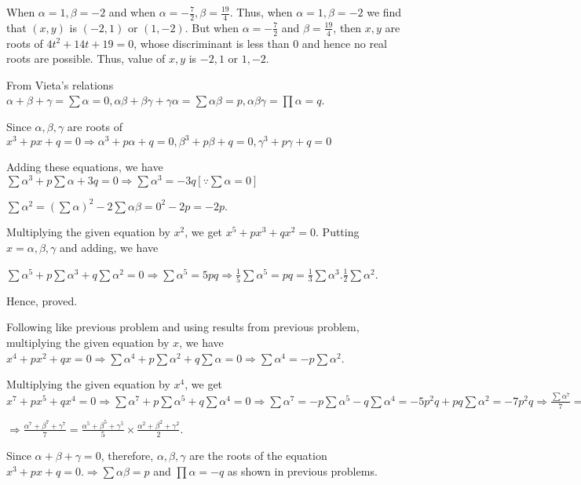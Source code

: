   When $\alpha = 1, \beta = -2$ and when $\alpha = -\frac{7}{2}, \beta = \frac{19}{4}$. Thus, when $\alpha
  =1, \beta = -2$ we find that $(x, y)$ is $(-2, 1)$ or $(1, -2)$. But when $\alpha = -\frac{7}{2}$ and
  $\beta = \frac{19}{4}$, then $x, y$ are roots of $4t^2 + 14t + 19 = 0$, whose discriminant is less than
  $0$ and hence no real roots are possible. Thus, value of $x, y$ is $-2, 1$ or $1, -2$.
\item From Vieta's relations $\alpha + \beta + \gamma = \sum \alpha = 0, \alpha\beta + \beta\gamma +
  \gamma\alpha = \sum \alpha\beta = p, \alpha\beta\gamma = \prod\alpha = q$.

  Since $\alpha, \beta, \gamma$ are roots of $x^3 + px + q = 0 \Rightarrow \alpha^3 + p\alpha + q = 0,
  \beta^3 + p\beta + q = 0, \gamma^3 + p\gamma + q = 0$

  Adding these equations, we have $\sum\alpha^3 + p\sum\alpha + 3q = 0 \Rightarrow \sum\alpha^3 =
  -3q[\because \sum\alpha = 0]$

  $\sum\alpha^2 = (\sum\alpha)^2 - 2\sum\alpha\beta = 0^2 - 2p = -2p$.

  Multiplying the given equation by $x^2$, we get $x^5 + px^3 + qx^2 = 0$. Putting $x = \alpha, \beta,
  \gamma$ and adding, we have

  $\sum\alpha^5 + p\sum\alpha^3 + q\sum\alpha^2 = 0 \Rightarrow \sum\alpha^5 = 5pq\Rightarrow
  \frac{1}{5}\sum\alpha^5 = pq = \frac{1}{3}\sum\alpha^3 .
  \frac{1}{2}\sum\alpha^2$.

  Hence, proved.
\item Following like previous problem and using results from previous problem, multiplying the given
  equation by $x$, we have $x^4 + px^2 + qx = 0 \Rightarrow \sum\alpha^4 + p\sum\alpha^2 + q\sum\alpha =
  0\Rightarrow \sum\alpha^4 = -p\sum\alpha^2$.

  Multiplying the given equation by $x^4$, we get $x^7 + px^5 + qx^4 = 0 \Rightarrow \sum\alpha^7 +
  p\sum\alpha^5 + q\sum\alpha^4 = 0\Rightarrow \sum\alpha^7 = -p\sum\alpha^5 -
  q\sum\alpha^4 = -5p^2q +
  pq\sum\alpha^2 = -7p^2q \Rightarrow \frac{\sum\alpha^7}{7} = pq.(-p) =
  \frac{\sum\alpha^5}{5}.\frac{\sum\alpha^2}{2}$

  $\Rightarrow \frac{\alpha^7 + \beta^7 + \gamma^7}{7} = \frac{\alpha^5 + \beta^5 + \gamma^5}{5}\times
  \frac{\alpha^2 + \beta^2 + \gamma^2}{2}$.
\item Since $\alpha + \beta + \gamma = 0$, therefore, $\alpha, \beta, \gamma$ are the roots of the equation
  $x^3 + px + q = 0.\Rightarrow \sum\alpha\beta = p$ and $\prod\alpha = -q$ as shown in previous problems.

